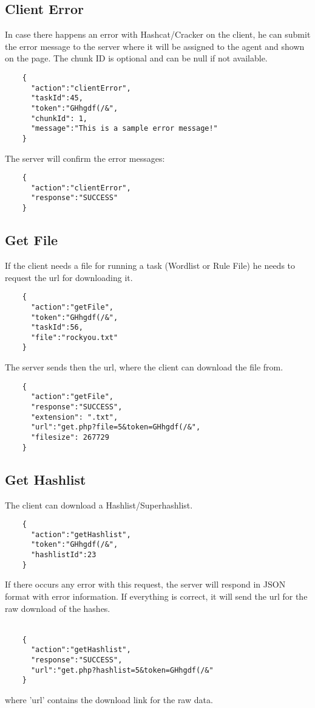 \documentclass{article}
\begin{document}
	\subsection*{Client Error}
	In case there happens an error with Hashcat/Cracker on the client, he can submit the error message to the server where it will be assigned to the agent and shown on the page. The chunk ID is optional and can be null if not available.
	\begin{verbatim}
	{
	  "action":"clientError",
	  "taskId":45,
	  "token":"GHhgdf(/&",
	  "chunkId": 1,
	  "message":"This is a sample error message!"
	}
	\end{verbatim}
	The server will confirm the error messages:
	\begin{verbatim}
	{
	  "action":"clientError",
	  "response":"SUCCESS"
	}
	\end{verbatim}
	
	\subsection*{Get File}
	If the client needs a file for running a task (Wordlist or Rule File) he needs to request the url for downloading it.
	\begin{verbatim}
	{
	  "action":"getFile",
	  "token":"GHhgdf(/&",
	  "taskId":56,
	  "file":"rockyou.txt"
	}
	\end{verbatim}
	The server sends then the url, where the client can download the file from.
	\begin{verbatim}
	{
	  "action":"getFile",
	  "response":"SUCCESS",
	  "extension": ".txt",
	  "url":"get.php?file=5&token=GHhgdf(/&",
	  "filesize": 267729
	}
	\end{verbatim}
	
	\subsection*{Get Hashlist}
	The client can download a Hashlist/Superhashlist.
	\begin{verbatim}
	{
	  "action":"getHashlist",
	  "token":"GHhgdf(/&",
	  "hashlistId":23
	}
	\end{verbatim}
	If there occurs any error with this request, the server will respond in JSON format with error information. If everything is correct, it will send the url for the raw download of the hashes.\\\\
	\begin{verbatim}
	{
	  "action":"getHashlist",
	  "response":"SUCCESS",
	  "url":"get.php?hashlist=5&token=GHhgdf(/&"
	}
	\end{verbatim}
	where 'url' contains the download link for the raw data.
	
\end{document}
